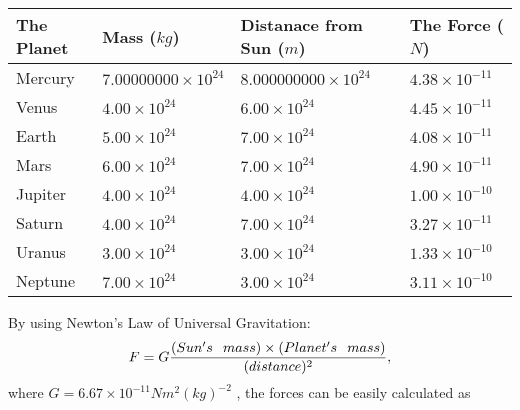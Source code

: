 \documentclass[12pt]{article}
\begin{document}
 
\begin{tabular}{|l|l|l|l|}
\hline
The Planet & Mass ($kg$) & Distanace from Sun ($m$) & The Force ($N$)\\
\hline
Mercury  &
           $ %
7.00000000 \times 10^{24} $   &
             $ %
8.000000000 \times 10^{24} $    & $ %
4.38 \times 10^{-11} $
\\  \hline
Venus    &
           $  %
4.00 \times 10^{24}  $     &
             $ %
6.00 \times 10^{24} $    & $ %
4.45 \times 10^{-11} $
\\  \hline
Earth    &
           $  %
5.00 \times 10^{24}  $     &
             $ %
7.00 \times 10^{24} $    & $ %
4.08 \times 10^{-11} $
\\   \hline
Mars     &
           $  %
6.00 \times 10^{24} $     &
             $ %
7.00 \times 10^{24} $    & $ %
4.90 \times 10^{-11} $
\\   \hline
Jupiter  &
           $  %
4.00 \times 10^{24} $    &
             $ %
4.00 \times 10^{24} $    & $ %
1.00 \times 10^{-10} $
\\  \hline
Saturn   &
           $  %
4.00 \times 10^{24} $    &
             $ %
7.00 \times 10^{24}  $    & $ %
3.27 \times 10^{-11} $
\\  \hline
Uranus   &
           $  %
3.00 \times 10^{24} $    &
             $ %
3.00 \times 10^{24} $    & $ %
1.33 \times 10^{-10} $
\\  \hline
Neptune  &
           $  %
7.00 \times 10^{24} $    &
             $ %
3.00 \times 10^{24} $    & $ %
3.11 \times 10^{-10} $
\\  \hline
 
\end{tabular}
 
 
 
 
\noindent{}
 
 

 
 
 
 
\noindent{}
 
 

By using Newton's Law of Universal Gravitation:
\[
F=G \frac{(Sun's \hspace{0.1in} mass) \times (Planet's \hspace{0.1in} mass)} { (distance)^2},
\]
where
$ G= %
6.67 \times 10^{-11} N m^{2}(kg)^{-2}$ , the forces can be easily calculated as
 
\end{document}
